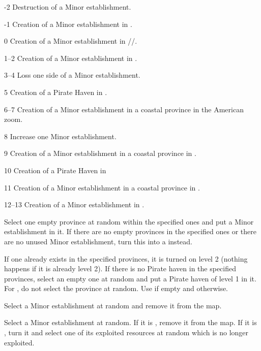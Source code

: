 \begin{modlist}[3em]
\item[-2] Destruction of a Minor establishment.
\item[-1] Creation of a Minor establishment in \continentBresil.
\item[0] Creation of a Minor establishment in
  \granderegionEcuador/\granderegionYucatan/\granderegionPanama.
\item[1--2] Creation of a Minor establishment in \continentCaraibes.
\item[3--4] Loss one side of a Minor establishment.
\item[5] Creation of a Pirate Haven in \continentCaraibes.
\item[6--7] Creation of a Minor establishment in a coastal province in the
  American zoom.
\item[8] Increase one Minor establishment.
\item[9] Creation of a Minor establishment in a coastal province in
  \continentIndia.
\item[10] Creation of a Pirate Haven in \granderegionMadagascar
\item[11] Creation of a Minor establishment in a coastal province in
  \continentIndia.
\item[12--13] Creation of a Minor establishment in \continentCaraibes.
\end{modlist}

 Select one empty province at
random within the specified ones and put a Minor establishment \Facemoins in
it.
\bparag If there are no empty provinces in the specified ones or there are no
unused Minor establishment, turn this into a  instead.

 If one already exists in the specified
provinces, it is turned on level 2 (nothing happens if it is already level 2).
\bparag If there is no Pirate haven in the specified provinces, select an
empty one at random and put a Pirate haven of level 1 in it.
\bparag For \granderegionMadagascar, do not select the province at random. Use
 if empty and  otherwise.

 Select a Minor establishment at
random and remove it from the map.

 Select a Minor establishment at random.
\bparag If it is \Facemoins, remove it from the map.
\bparag If it is \Faceplus, turn it \Facemoins and select one of its exploited
resources at random which is no longer exploited.

